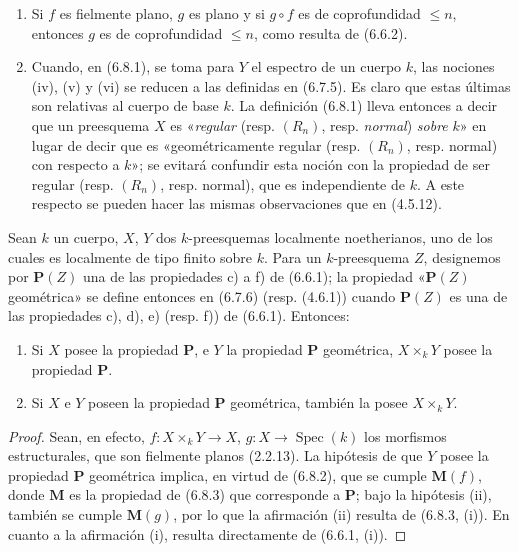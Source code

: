 \begin{remarks}[6.8.4]
\label{IV.2.s6.8.4-fr}
\begin{enumerate}
\item[(i)] Si $f$ es fielmente plano, $g$ es plano y si $g\circ f$ es de
coprofundidad $\leq n$, entonces $g$ es de coprofundidad $\leq n$, como
resulta de (6.6.2).
\item[(ii)] Cuando, en (6.8.1), se toma para $Y$ el espectro de un cuerpo
$k$, las nociones (iv), (v) y (vi) se reducen a las definidas en (6.7.5).
Es claro que estas últimas son relativas al cuerpo de base $k$. La
definición (6.8.1) lleva entonces a decir que un preesquema $X$ es «\emph{regular}
(resp. $(R_n)$, resp. \emph{normal}) \emph{sobre} $k$» en lugar de decir que es
«geométricamente regular (resp. $(R_n)$, resp. normal) con respecto a $k$»;
se evitará confundir esta noción con la propiedad de ser regular (resp.
$(R_n)$, resp. normal), que es independiente de $k$. A este respecto se
pueden hacer las mismas observaciones que en (4.5.12).
\end{enumerate}
\end{remarks}

\begin{proposition}[6.8.5]
\label{IV.2.s6.8.5-fr}
Sean $k$ un cuerpo, $X$, $Y$ dos $k$-preesquemas localmente noetherianos,
uno de los cuales es localmente de tipo finito sobre $k$. Para un $k$-preesquema $Z$,
designemos por $\boldsymbol{P}(Z)$ una de las propiedades \textup{c)} a \textup{f)} de \textup{(6.6.1)}; la propiedad
«$\boldsymbol{P}(Z)$ geométrica» se define entonces en \textup{(6.7.6) (resp. (4.6.1))} cuando
$\boldsymbol{P}(Z)$ es una de las propiedades \textup{c), d), e) (resp. f))} de \textup{(6.6.1)}. Entonces:
\begin{enumerate}
\item[\textup{(i)}] Si $X$ posee la propiedad $\boldsymbol{P}$, e $Y$ la propiedad $\boldsymbol{P}$
geométrica, $X\times_kY$ posee la propiedad $\boldsymbol{P}$.
\item[\textup{(ii)}] Si $X$ e $Y$ poseen la propiedad $\boldsymbol{P}$ geométrica, también la
posee $X\times_kY$.
\end{enumerate}
\end{proposition}

\begin{proof}
Sean, en efecto, $f:X\times_kY\to X$, $g:X\to\operatorname{Spec}(k)$ los
morfismos estructurales, que son fielmente planos (2.2.13). La hipótesis de que
$Y$ posee la propiedad $\boldsymbol{P}$ geométrica implica, en virtud de (6.8.2), que
se cumple $\boldsymbol{M}(f)$, donde $\boldsymbol{M}$ es la propiedad de (6.8.3) que corresponde a $\boldsymbol{P}$; bajo
la hipótesis (ii), también se cumple $\boldsymbol{M}(g)$, por lo que la afirmación (ii) resulta de
(6.8.3, (i)). En cuanto a la afirmación (i), resulta directamente de (6.6.1, (i)).
\end{proof}
